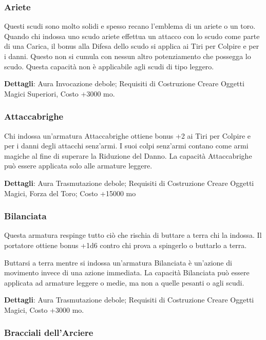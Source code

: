 \begin{multicols}{2}
	\subsubsection*{Ariete}

	Questi scudi sono molto solidi e spesso recano l'emblema di un ariete o un toro. Quando chi indossa uno scudo ariete effettua un attacco con lo scudo come parte di una Carica, il bonus alla Difesa dello scudo si applica ai Tiri per Colpire e per i danni. Questo non si cumula con nessun altro potenziamento che possegga lo scudo. Questa capacità non è applicabile agli scudi di tipo leggero.

	\textbf{Dettagli}: Aura Invocazione debole; Requisiti di Costruzione Creare Oggetti Magici Superiori, Costo +3000 mo.


	\subsubsection*{Attaccabrighe}

	Chi indossa un'armatura Attaccabrighe ottiene bonus +2 ai Tiri per Colpire e per i danni degli attacchi senz'armi. I suoi colpi senz'armi contano come armi magiche al fine di superare la Riduzione del Danno. La capacità Attaccabrighe può essere applicata solo alle armature leggere.

	\textbf{Dettagli}: Aura Trasmutazione debole; Requisiti di Costruzione Creare Oggetti Magici, Forza del Toro; Costo +15000 mo

	\subsubsection*{Bilanciata}

	Questa armatura respinge tutto ciò che rischia di buttare a terra chi la indossa. Il portatore ottiene bonus +1d6 contro chi prova a spingerlo o buttarlo a terra.

	Buttarsi a terra mentre si indossa un'armatura Bilanciata è un'azione di movimento invece di una azione immediata. La capacità Bilanciata può essere applicata ad armature leggere o medie, ma non a quelle pesanti o agli scudi.

	\textbf{Dettagli}: Aura Trasmutazione debole; Requisiti di Costruzione Creare Oggetti Magici, Costo +3000 mo.

	\subsubsection*{Bracciali dell'Arciere}


\end{multicols}
